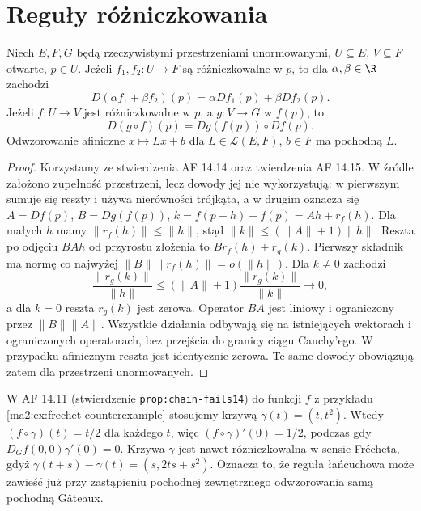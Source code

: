 \section{Reguły różniczkowania}

\begin{twierdzenie}
\label{ma2:thm:frechet-chain}
Niech $E,F,G$ będą rzeczywistymi przestrzeniami
unormowanymi, $U\subseteq E$, $V\subseteq F$ otwarte,
$p\in U$. Jeżeli $f_1,f_2:U\to F$ są różniczkowalne
w $p$, to dla $\alpha,\beta\in\R$ zachodzi
\[
 D(\alpha f_1+\beta f_2)(p)=
 \alpha Df_1(p)+\beta Df_2(p).
\]
Jeżeli $f:U\to V$ jest różniczkowalne w $p$,
a $g:V\to G$ w $f(p)$, to
\[
 D(g\circ f)(p)=Dg(f(p))\circ Df(p).
\]
Odwzorowanie afiniczne $x\mapsto Lx+b$ dla
$L\in\mathcal L(E,F)$, $b\in F$ ma pochodną $L$.
\end{twierdzenie}
\begin{proof}
Korzystamy ze stwierdzenia AF 14.14 oraz twierdzenia
AF 14.15. W źródle założono zupełność przestrzeni,
lecz dowody jej nie wykorzystują: w pierwszym
sumuje się reszty i używa nierówności trójkąta,
a w drugim oznacza się $A=Df(p)$, $B=Dg(f(p))$,
$k=f(p+h)-f(p)=Ah+r_f(h)$. Dla małych $h$ mamy
$\|r_f(h)\|\le\|h\|$, stąd
$\|k\|\le(\|A\|+1)\|h\|$.
Reszta po odjęciu $BAh$ od przyrostu złożenia
to $Br_f(h)+r_g(k)$. Pierwszy składnik ma normę
co najwyżej $\|B\|\|r_f(h)\|=o(\|h\|)$.
Dla $k\ne0$ zachodzi
\[
 \frac{\|r_g(k)\|}{\|h\|}
 \le(\|A\|+1)\frac{\|r_g(k)\|}{\|k\|}\longrightarrow0,
\]
a dla $k=0$ reszta $r_g(k)$ jest zerowa.
Operator $BA$ jest liniowy i ograniczony przez
$\|B\|\|A\|$.
Wszystkie działania odbywają się na istniejących
wektorach i ograniczonych operatorach, bez przejścia
do granicy ciągu Cauchy'ego. W przypadku afinicznym
reszta jest identycznie zerowa. Te same dowody
obowiązują zatem dla przestrzeni unormowanych.
\end{proof}

\begin{uwaga}
W AF 14.11 (stwierdzenie
\texttt{prop:chain-fails14}) do funkcji $f$ z przykładu
\ref{ma2:ex:frechet-counterexample} stosujemy krzywą
$\gamma(t)=(t,t^2)$. Wtedy $(f\circ\gamma)(t)=t/2$
dla każdego $t$, więc $(f\circ\gamma)'(0)=1/2$,
podczas gdy $D_Gf(0,0)\gamma'(0)=0$.
Krzywa $\gamma$ jest nawet różniczkowalna w sensie
Frécheta, gdyż $\gamma(t+s)-\gamma(t)=(s,2ts+s^2)$.
Oznacza to, że reguła łańcuchowa może zawieść już przy
zastąpieniu pochodnej zewnętrznego odwzorowania
samą pochodną Gâteaux.
\end{uwaga}

